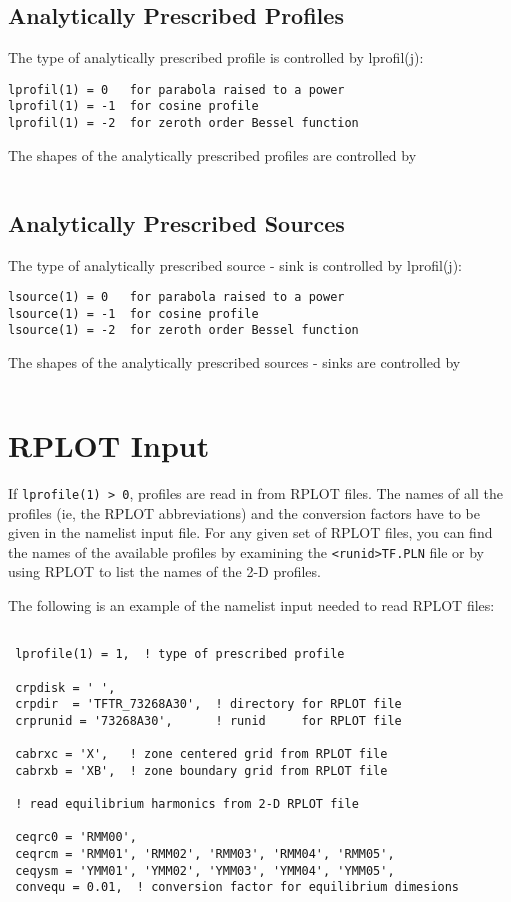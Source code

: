 \subsection{Analytically Prescribed Profiles}

The type of analytically prescribed profile is controlled by lprofil(j):
\begin{verbatim}
lprofil(1) = 0   for parabola raised to a power
lprofil(1) = -1  for cosine profile
lprofil(1) = -2  for zeroth order Bessel function
\end{verbatim}

The shapes of the analytically prescribed profiles are controlled by
\begin{verbatim}
\end{verbatim}


\subsection{Analytically Prescribed Sources}

The type of analytically prescribed source - sink 
is controlled by lprofil(j):
\begin{verbatim}
lsource(1) = 0   for parabola raised to a power
lsource(1) = -1  for cosine profile
lsource(1) = -2  for zeroth order Bessel function
\end{verbatim}

The shapes of the analytically prescribed sources - sinks 
are controlled by
\begin{verbatim}
\end{verbatim}

\section{RPLOT Input}

If {\tt lprofile(1) > 0}, profiles are read in from RPLOT files.
The names of all the profiles (ie, the RPLOT abbreviations) and the
conversion factors have to be given in the namelist input file.
For any given set of RPLOT files, you can find the names of the
available profiles by examining the {\tt <runid>TF.PLN} file or by
using RPLOT to list the names of the 2-D profiles.

The following is an example of the namelist input needed to read RPLOT
files:

\begin{verbatim}

 lprofile(1) = 1,  ! type of prescribed profile

 crpdisk = ' ',
 crpdir  = 'TFTR_73268A30',  ! directory for RPLOT file
 crprunid = '73268A30',      ! runid     for RPLOT file

 cabrxc = 'X',   ! zone centered grid from RPLOT file
 cabrxb = 'XB',  ! zone boundary grid from RPLOT file

 ! read equilibrium harmonics from 2-D RPLOT file

 ceqrc0 = 'RMM00',
 ceqrcm = 'RMM01', 'RMM02', 'RMM03', 'RMM04', 'RMM05',
 ceqysm = 'YMM01', 'YMM02', 'YMM03', 'YMM04', 'YMM05',
 convequ = 0.01,  ! conversion factor for equilibrium dimesions

\end{verbatim}

